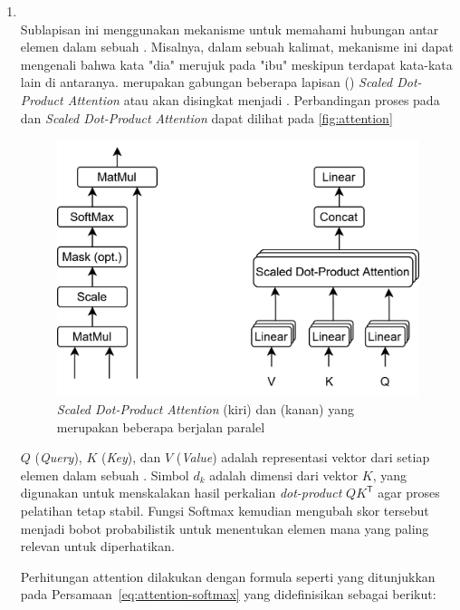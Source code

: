 \begin{enumerate}
\item \mha~\\
Sublapisan ini menggunakan mekanisme \selfattention{} untuk memahami hubungan antar elemen dalam sebuah \sequence{}. Misalnya, dalam sebuah kalimat, mekanisme ini dapat mengenali bahwa kata "dia" 
merujuk pada "ibu" meskipun terdapat kata-kata lain di antaranya. 
\mha{} merupakan gabungan beberapa lapisan (\layer) 
\emph{Scaled Dot-Product Attention} atau akan disingkat menjadi \attention. Perbandingan proses pada \mha{} dan \emph{Scaled Dot-Product Attention} dapat dilihat pada \autoref{fig:attention} 

\begin{figure}[htbp]
\centering
\includegraphics[width=.8\textwidth]{images/attentionmha.png}
	\caption{\emph{Scaled Dot-Product Attention} (kiri) dan \mha{} (kanan) yang merupakan beberapa \layer{} \attention{} berjalan paralel \parencite{vaswani2017attention}}
	\label{fig:attention}
\end{figure}

$Q$ (\emph{Query}), $K$ (\emph{Key}), dan $V$ (\emph{Value}) adalah representasi vektor dari setiap elemen dalam sebuah \sequence. Simbol $d_k$ adalah dimensi dari vektor $K$, yang digunakan untuk menskalakan hasil perkalian \emph{dot-product} $QK^\mathsf{T}$ agar proses pelatihan tetap stabil. Fungsi Softmax kemudian mengubah skor tersebut menjadi bobot probabilistik untuk menentukan elemen mana yang paling relevan untuk diperhatikan.

\pagebreak

Perhitungan attention dilakukan dengan formula seperti yang ditunjukkan pada Persamaan~\eqref{eq:attention-softmax} \parencite{vaswani2017attention} yang didefinisikan sebagai berikut:


\end{enumerate}
